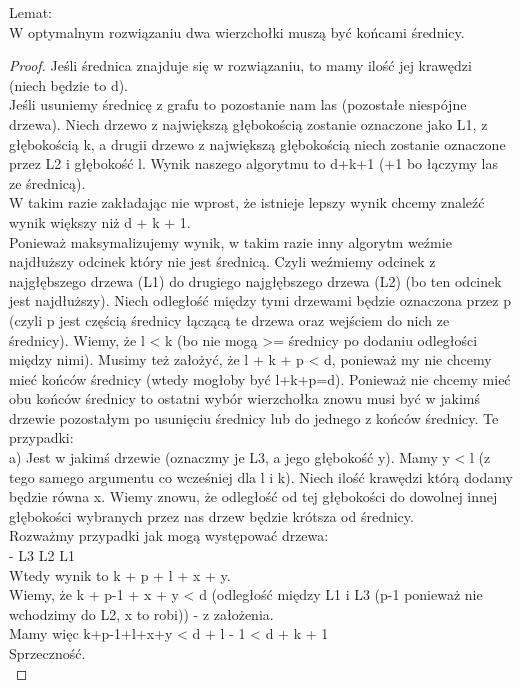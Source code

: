\documentclass{article}
\theoremstyle{plain}
\begin{document}
Lemat:\\
W optymalnym rozwiązaniu dwa wierzchołki muszą być końcami średnicy.\\
\begin{proof}
Jeśli średnica znajduje się w rozwiązaniu, to mamy ilość jej krawędzi (niech będzie to d). \\

Jeśli usuniemy średnicę z grafu to pozostanie nam las (pozostałe niespójne drzewa). Niech drzewo z największą głębokością zostanie oznaczone jako L1, z głębokością k, a drugii drzewo z największą głębokością niech zostanie oznaczone przez L2 i głębokość l. Wynik naszego algorytmu to d+k+1 (+1 bo łączymy las ze średnicą).\\

W takim razie zakładając nie wprost, że istnieje lepszy wynik chcemy znaleźć wynik większy niż d + k + 1.\\


Ponieważ maksymalizujemy wynik, w takim razie inny algorytm weźmie najdłuższy odcinek który nie jest średnicą. Czyli weźmiemy odcinek z najgłębszego drzewa (L1) do drugiego najgłębszego drzewa (L2) (bo ten odcinek jest najdłuższy). Niech odległość między tymi drzewami będzie oznaczona przez p (czyli p jest częścią średnicy łączącą te drzewa oraz wejściem do nich ze średnicy). Wiemy, że l < k (bo nie mogą >= średnicy po dodaniu odległości między nimi). Musimy też założyć, że l + k + p < d, ponieważ my nie chcemy mieć końców średnicy (wtedy mogłoby być l+k+p=d). Ponieważ nie chcemy mieć obu końców średnicy to ostatni wybór wierzchołka znowu musi być w jakimś drzewie pozostałym po usunięciu średnicy lub do jednego z końców średnicy. Te przypadki: \\

a) Jest w jakimś drzewie (oznaczmy je L3, a jego głębokość y). Mamy y < l (z tego samego argumentu co wcześniej dla l i k). Niech ilość krawędzi którą dodamy będzie równa x. Wiemy znowu, że odległość od tej głębokości do dowolnej innej głębokości wybranych przez nas drzew będzie krótsza od średnicy.\\

Rozważmy przypadki jak mogą występować drzewa:\\
- L3 L2 L1 \\
Wtedy wynik to k + p + l + x + y. \\
Wiemy, że k + p-1 + x + y < d (odległość między L1 i L3 (p-1 ponieważ nie wchodzimy do L2, x to robi)) - z założenia.\\
Mamy więc k+p-1+l+x+y < d + l - 1 < d + k + 1\\
Sprzeczność.\\


\end{proof}
\end{document}
